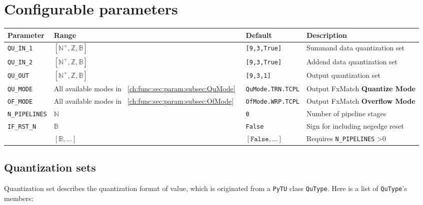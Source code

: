 \documentclass[a4paper, oneside]{report}
\begin{document}
        \section{Configurable parameters}
            \begin{longtable}{llll}
                \toprule
                \textbf{Parameter}  & \textbf{Range}  & \textbf{Default} & \textbf{Description} \\
                \midrule
                
                \texttt{QU\_IN\_1}     & $[\mathbb{N}^{+}, \mathbb{Z}, \mathbb{B}]$  & \texttt{[9,3,True]}                      & Summand data quantization set \\
                \texttt{QU\_IN\_2}    & $[\mathbb{N}^{+}, \mathbb{Z}, \mathbb{B}]$  & \texttt{[9,3,True]}                      & Addend data quantization set \\
                \texttt{QU\_OUT}     & $[\mathbb{N}^{+}, \mathbb{Z}, \mathbb{B}]$  & \texttt{[9,3,1]}                      & Output quantization set \\
                \texttt{QU\_MODE}    & All available modes in ~\ref{ch:func:sec:param:subsec:QuMode}~       & \texttt{QuMode.TRN.TCPL}     & Output FxMatch \textbf{Quantize Mode} \\
                \texttt{OF\_MODE}   &  All available modes in  ~\ref{ch:func:sec:param:subsec:OfMode}~     & \texttt{OfMode.WRP.TCPL} & Output FxMatch \textbf{Overflow Mode}          \\
                \texttt{N\_PIPELINES}  & $\mathbb{N}$  & \texttt{0}  & Number of pipeline stages \\
                \texttt{IF\_RST\_N}  & $\mathbb{B}$  & \texttt{False}  & Sign for including negedge reset \\
                                    & $[\mathbb{B}, ...]$ & $[\texttt{False}, ...]$ & Requires \texttt{N\_PIPELINES} >0      \\           
                \bottomrule
            \end{longtable}
            \subsection{Quantization sets}\label{ch:func:sec:param:subsec:QuSet}
                Quantization set describes the quantization format of value, which is originated from a \texttt{PyTU} class \texttt{QuType}. Here is a list of \texttt{QuType}'s members:
\end{document}

